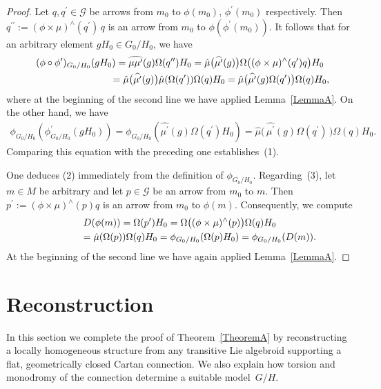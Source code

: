 \begin{proof}
  Let $q,q^\prime \in {\mathcal G} $ be arrows from $m_0$ to
  $\phi(m_0)$, $\phi^\prime(m_0)$ respectively. Then
  $q^{\prime\prime}:=(\phi \times \mu)^\wedge(q^\prime)\,q$ is an
  arrow from $m_0$ to $\phi(\phi^\prime(m_0))$. It follows that for an
  arbitrary element $gH_0\in {G_0/H_0}$, we have
  \begin{gather*}
    (\phi \circ  \phi^\prime)_{G_0/H_0}(gH_0)=\widehat{\mu \mu^\prime}(g)\Omega(q^{\prime\prime})H_0=\hat\mu\big(\widehat{\mu^\prime}(g)\big)\Omega\big( (\phi \times \mu)^\wedge(q^\prime)q \big)H_0\\
    \hphantom{(\phi \circ  \phi^\prime)_{G_0/H_0}(gH_0)}{}
=\hat\mu\big(\widehat{\mu^\prime}(g)\big)\hat\mu(\Omega(q^\prime))\Omega(q)H_0=
\hat\mu \big( \widehat{\mu^\prime}(g)\Omega(q^\prime) \big)\Omega(q)H_0,
  \end{gather*}
  where at the beginning of the second line we have applied Lemma~\ref{LemmaA}. On the other hand, we have
  \begin{gather*}
    \phi_{G_0/H_0}(\phi^\prime_{G_0/H_0}(gH_0))=
     \phi_{G_0/H_0}(\widehat{\mu^\prime}(g)\Omega(q^\prime)H_0)=\hat\mu \Big(\,\widehat{\mu^\prime}(g)\Omega(q^\prime)\,\Big)\Omega(q)H_0.
   \end{gather*}
   Comparing this equation with the preceding one establishes~(1).

   One deduces (2) %
   immediately from the def\/inition of
   $\phi_{G_0/H_0} $. Regarding~(3), %
   let $m \in M$ be
   arbitrary and let $p \in {\mathcal G} $ be an arrow from $m_0$ to
   $m$. Then $p^\prime := (\phi \times \mu)^\wedge(p) q$ is an arrow
   from $m_0$ to $\phi(m)$. Consequently, we compute
\begin{gather*}
  D(\phi(m))=\Omega(p^\prime)H_0=\Omega \big( (\phi \times
  \mu)^\wedge(p) \big)\Omega(q)H_0\\
\hphantom{D(\phi(m))}{}  =\hat\mu(\Omega(p))\Omega(q)H_0
  =\phi_{G_0/H_0}(\Omega(p)H_0)=\phi_{G_0/H_0}(D(m)).
\end{gather*}
At the beginning of the second line we have again applied Lemma~\ref{LemmaA}.
\end{proof}

\section{Reconstruction}\label{main}

In this section we complete the proof of Theorem~\ref{TheoremA} by reconstructing a
locally homogeneous structure from any transitive Lie algebroid
supporting a f\/lat, geometrically closed Cartan connection. We also
explain how torsion and monodromy of the connection determine a
suitable model~$G/H$.

